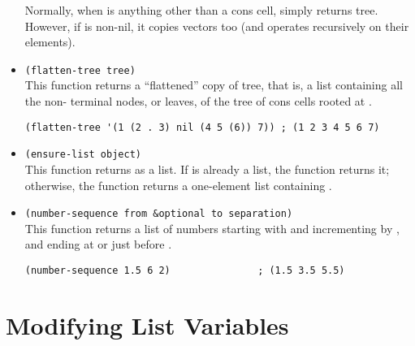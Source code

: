 \begin{itemize}
  Normally, when  is anything other than a cons cell,  simply returns tree.
  However, if  is non-nil, it copies vectors too (and operates recursively on their elements).
\item \lstinline|(flatten-tree tree)|\\
  This function returns a ``flattened'' copy of tree, that is, a list containing all the non- terminal nodes, or leaves, of the tree of cons cells rooted at .
\begin{lstlisting}
(flatten-tree '(1 (2 . 3) nil (4 5 (6)) 7)) ; (1 2 3 4 5 6 7)
\end{lstlisting}
\item \lstinline|(ensure-list object)|\\
  This function returns  as a list.
  If  is already a list, the function returns it; otherwise, the function returns a one-element list containing .
\item \lstinline|(number-sequence from &optional to separation)|\\
  This function returns a list of numbers starting with  and incrementing by , and ending at or just before .
\begin{lstlisting}
(number-sequence 1.5 6 2)               ; (1.5 3.5 5.5)
\end{lstlisting}
\end{itemize}

\section{Modifying List Variables}
\label{sec:modify-list-vari}

